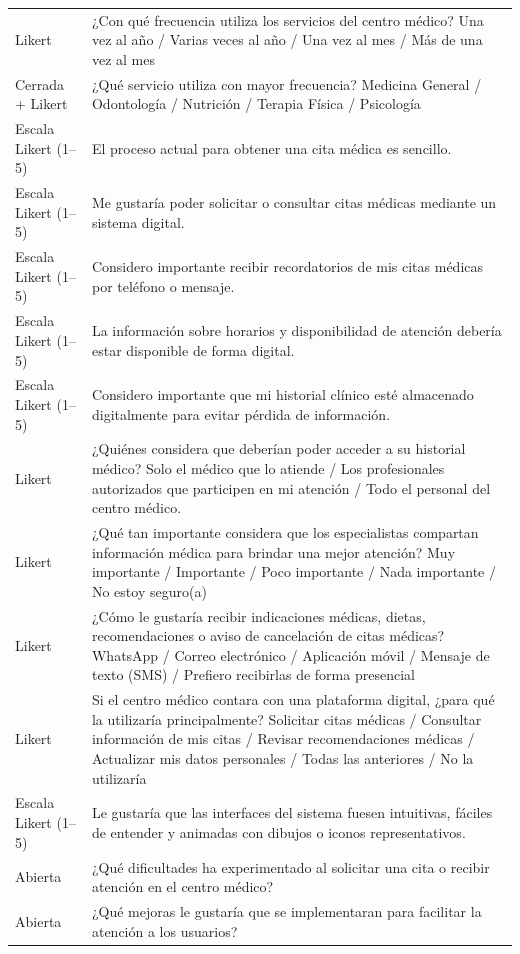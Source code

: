 \documentclass[11pt,a4paper]{article}
\begin{document}
\begin{longtable}{p{} p{} }
		Likert & ¿Con qué frecuencia utiliza los servicios del centro médico? Una vez al año / Varias veces al año / Una vez al mes / Más de una vez al mes \\
		Cerrada + Likert & ¿Qué servicio utiliza con mayor frecuencia? Medicina General / Odontología / Nutrición / Terapia Física / Psicología \\
		Escala Likert (1--5) & El proceso actual para obtener una cita médica es sencillo. \\
		Escala Likert (1--5) & Me gustaría poder solicitar o consultar citas médicas mediante un sistema digital. \\
		Escala Likert (1--5) & Considero importante recibir recordatorios de mis citas médicas por teléfono o mensaje. \\
		Escala Likert (1--5) & La información sobre horarios y disponibilidad de atención debería estar disponible de forma digital. \\
		Escala Likert (1--5) & Considero importante que mi historial clínico esté almacenado digitalmente para evitar pérdida de información. \\
		Likert & ¿Quiénes considera que deberían poder acceder a su historial médico? Solo el médico que lo atiende / Los profesionales autorizados que participen en mi atención / Todo el personal del centro médico. \\
		Likert & ¿Qué tan importante considera que los especialistas compartan información médica para brindar una mejor atención? Muy importante / Importante / Poco importante / Nada importante / No estoy seguro(a) \\
		Likert & ¿Cómo le gustaría recibir indicaciones médicas, dietas, recomendaciones o aviso de cancelación de citas médicas? WhatsApp / Correo electrónico / Aplicación móvil / Mensaje de texto (SMS) / Prefiero recibirlas de forma presencial \\
		Likert & Si el centro médico contara con una plataforma digital, ¿para qué la utilizaría principalmente? Solicitar citas médicas / Consultar información de mis citas / Revisar recomendaciones médicas / Actualizar mis datos personales / Todas las anteriores / No la utilizaría \\
		Escala Likert (1--5) & Le gustaría que las interfaces del sistema fuesen intuitivas, fáciles de entender y animadas con dibujos o iconos representativos. \\
		Abierta & ¿Qué dificultades ha experimentado al solicitar una cita o recibir atención en el centro médico? \\
		Abierta & ¿Qué mejoras le gustaría que se implementaran para facilitar la atención a los usuarios? \\
		\bottomrule
	\end{longtable}
	
\end{document}
